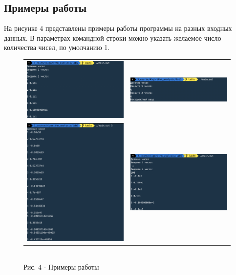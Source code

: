 \documentclass[a4paper,14pt]{article} %
\begin{document}
        \subsection{Примеры работы}
	\hfill
	
	На рисунке 4 представлены примеры работы программы на разных входных данных. В параметрах командной строки можно указать желаемое число количества чисел, по умолчанию 1.
	\begin{figure}[ht]\center
		\begin{tabular}{cc}
			\includegraphics[width=80mm]{ex1} & \includegraphics[width=80mm]{ex2} \\
			\includegraphics[width=80mm]{ex3} & \includegraphics[width=80mm]{ex4}
		\end{tabular}
		\\ Рис. 4 - Примеры работы
	\end{figure}
	
\end{document}
